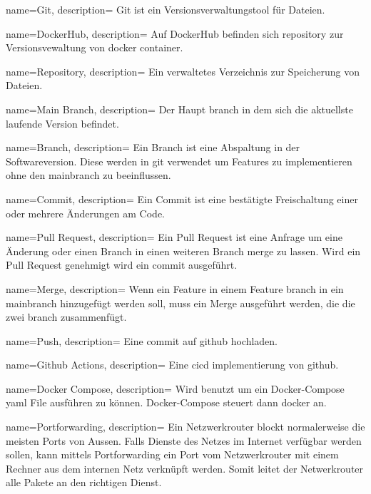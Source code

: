 {
	name=Git,
	description={
		Git ist ein Versionsverwaltungstool für Dateien.
	}
}

{
	name=DockerHub,
	description={
		Auf DockerHub befinden sich \gls{repository} zur Versionsvewaltung von \gls{docker} \gls{container}.
	}
}

{
	name=Repository,
	description={
		Ein verwaltetes Verzeichnis zur Speicherung von Dateien.
	}
}

{
	name=Main Branch,
	description={
		Der Haupt \gls{branch} in dem sich die aktuellste laufende Version befindet.
	}
}

{
	name=Branch,
	description={
		Ein Branch ist eine Abspaltung in der Softwareversion. Diese werden in \gls{git} verwendet um Features zu implementieren ohne den \gls{mainbranch} zu beeinflussen.
	}
}

{
	name=Commit,
	description={
		Ein Commit ist eine bestätigte Freischaltung einer oder mehrere Änderungen am Code.
	}
}

{
	name=Pull Request,
	description={
		Ein Pull Request ist eine Anfrage um eine Änderung oder einen Branch in einen weiteren Branch \gls{merge} zu lassen. Wird ein Pull Request genehmigt wird ein \gls{commit} ausgeführt.
	}
}

{
	name=Merge,
	description={
		Wenn ein Feature in einem Feature \gls{branch} in ein \gls{mainbranch} hinzugefügt werden soll, muss ein Merge ausgeführt werden, die die zwei \gls{branch} zusammenfügt.
	}
}

{
	name=Push,
	description={
		Eine \gls{commit} auf \gls{github} hochladen.
	}
}

{
	name=Github Actions,
	description={
		Eine \gls{cicd} implementierung von \gls{github}.
	}
}

{
	name=Docker Compose,
	description={
		Wird benutzt um ein Docker-Compose \gls{yaml} File ausführen zu können. Docker-Compose steuert dann \gls{docker} an.
	}
}

{
	name=Portforwarding,
	description={
		Ein Netzwerkrouter blockt normalerweise die meisten Ports von Aussen. Falls Dienste des Netzes im Internet verfügbar werden sollen, kann mittels Portforwarding ein Port vom Netzwerkrouter mit einem Rechner aus dem internen Netz verknüpft werden. Somit leitet der Netwerkrouter alle Pakete an den richtigen Dienst.
	}
}

